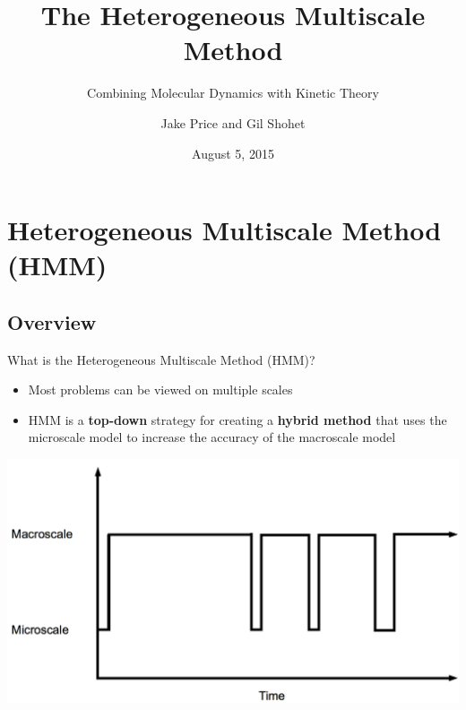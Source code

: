 \documentclass{beamer}
\title{The Heterogeneous Multiscale Method}
\subtitle{Combining Molecular Dynamics with Kinetic Theory}
\author[Price and Shohet]{Jake Price and Gil Shohet}
\institute[CPSSW]{Computational Physics Student Summer Workshop}
\date{August 5, 2015}
\begin{document}
	
	\begin{frame}
		\titlepage
	\end{frame}
	
	\section{Heterogeneous Multiscale Method (HMM)}
	\subsection{Overview}
	\begin{frame}{What is the Heterogeneous Multiscale Method (HMM)?}
		\begin{itemize}
		\item Most problems can be viewed on multiple scales\vspace{1em}
		\item HMM is a \textbf{top-down} strategy for creating a \textbf{hybrid method} that uses the microscale model to increase the accuracy of the macroscale model
		\end{itemize}
		
		\begin{center}
			\includegraphics[height = 0.5\textheight]{scheme.png}
			\end{center}
	\end{frame}
	
\end{document}
